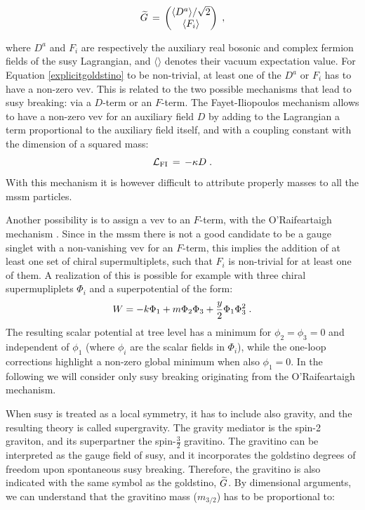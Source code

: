 \begin{equation}
 \widetilde{G} \,=\, 
 \begin{pmatrix}
\langle D^a \rangle /\sqrt{2} \cr \langle F_i\rangle 
\end{pmatrix} \; ,
\label{explicitgoldstino}
\end{equation} 

\noindent where $D^a$ and $F_i$ are respectively the auxiliary real bosonic and complex fermion fields of the \gls{susy} Lagrangian, and $\langle \rangle $ denotes their vacuum expectation value. For Equation \ref{explicitgoldstino} to be non-trivial, at least one of the $D^a$ or $F_i$ has to have a non-zero \gls{vev}. This is related to the two possible mechanisms that lead to \gls{susy} breaking: via a $D$-term or an $F$-term. 
The Fayet-Iliopoulos mechanism \cite{Fayet:1974jb} allows to have a non-zero \gls{vev} for an auxiliary field $D$ by adding to the Lagrangian a term proportional to the auxiliary field itself, and with a coupling constant with the dimension of a squared mass:
\begin{equation}
\mathcal{L}_{\rm FI} \,=\, -\kappa D \; .
\end{equation}
With this mechanism it is however difficult to attribute properly masses to all the \gls{mssm} particles.

Another possibility is to assign a \gls{vev} to an $F$-term, with the O’Raifeartaigh mechanism \cite{ORaifeartaigh:1975nky}. Since in the \gls{mssm} there is not a good candidate to be a gauge singlet with a non-vanishing \gls{vev} for an $F$-term, this implies the addition of at least one set of chiral supermultiplets, such that $F_i$ is non-trivial for at least one of them. A realization of this is possible for example with three chiral supermupliplets $\Phi_i$ and a superpotential of the form:
\begin{equation}
W = -k \Phi_1 + m \Phi_2 \Phi_3 + {y\over 2} \Phi_1 \Phi_3^2 \;.
\label{oraif}
\end{equation}
The resulting scalar potential at tree level has a minimum for $\phi_2=\phi_3=0$ and independent of $\phi_1$ (where $\phi_i$ are the scalar fields in $\Phi_i$), while the one-loop corrections highlight a non-zero global minimum when also $\phi_1=0$. In the following we will consider only \gls{susy} breaking originating from the O’Raifeartaigh mechanism.


When \gls{susy} is treated as a local symmetry, it has to include also gravity, and the resulting theory is called supergravity. The gravity mediator is the spin-2 graviton, and its superpartner the spin-$\frac{3}{2}$ gravitino. The gravitino can be interpreted as the gauge field of \gls{susy}, and it incorporates the goldstino degrees of freedom upon spontaneous \gls{susy} breaking. Therefore, the gravitino is also indicated with the same symbol as the goldstino, $\widetilde{G}$. By dimensional arguments, we can understand that the gravitino mass ($m_{3/2}$) has to be proportional to:

